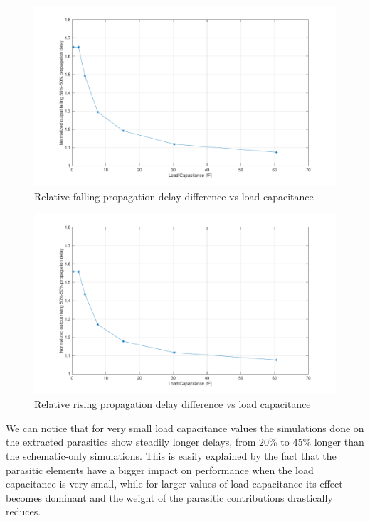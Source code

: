 \documentclass[a4paper]{article}
\begin{document}
\begin{figure}[H]
	\centering
	\includegraphics[width=\linewidth]{../INV_X4/simulations/tp_L_diff.pdf}
	\caption{Relative falling propagation delay difference vs load capacitance}
	\label{fig:inv_tp_L_diff}
\end{figure}
\begin{figure}[H]
	\centering
	\includegraphics[width=\linewidth]{../INV_X4/simulations/tp_H_diff.pdf}
	\caption{Relative rising propagation delay difference vs load capacitance}
	\label{fig:inv_tp_H_diff}
\end{figure}

We can notice that for very small load capacitance values the simulations done on the extracted parasitics show steadily longer delays, from 20\% to 45\% longer than the schematic-only simulations. This is easily explained by the fact that the parasitic elements have a bigger impact on performance when the load capacitance is very small, while for larger values of load capacitance its effect becomes dominant and the weight of the parasitic contributions drastically reduces.
\end{document}
